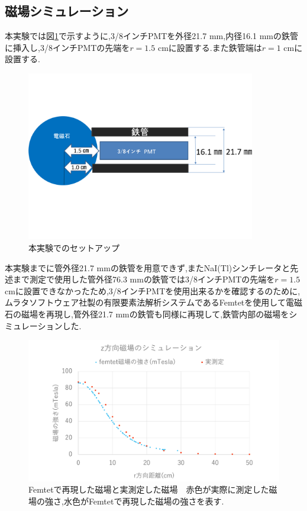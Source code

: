 \subsection{磁場シミュレーション}
本実験では図\ref{honjikken1}で示すように,3/8インチPMTを外径21.7 mm,内径16.1 mmの鉄管に挿入し,3/8インチPMTの先端を$r=1.5$ cmに設置する.また鉄管端は$r=1$ cmに設置する.

\begin{figure}[tbp]
	\centering
		\includegraphics[width=10cm]{fig/iguchi/honjikken1.pdf}
	\caption{本実験でのセットアップ}
	\label{honjikken1}
\end{figure}

本実験までに管外径21.7 mmの鉄管を用意できず,またNaI(Tl)シンチレータと先述まで測定で使用した管外径76.3 mmの鉄管では3/8インチPMTの先端を$r=1.5$ cmに設置できなかったため,3/8インチPMTを使用出来るかを確認するのために,ムラタソフトウェア社製の有限要素法解析システムであるFemtetを使用して電磁石の磁場を再現し,管外径21.7 mmの鉄管も同様に再現して,鉄管内部の磁場をシミュレーションした.

\begin{figure}[tbp]
	\centering
		\includegraphics[width=16cm]{fig/iguchi/magnetgraph2.pdf}
	\caption{Femtetで再現した磁場と実測定した磁場\newline　赤色が実際に測定した磁場の強さ,水色がFemtetで再現した磁場の強さを表す.}
	\label{magnetgraph2}
\end{figure}

